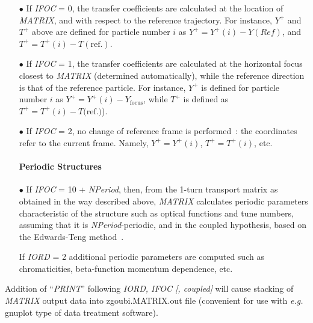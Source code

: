 \begin{itemize}
\item[$\bullet$] If \textsl{IFOC} = 0,  the transfer coefficients are calculated
at the location of \textsl{MATRIX}, and with respect to the reference trajectory. 
For instance, $ Y^+ $ and $ T^+ $ above are defined for particle number $ i $ as 
$Y^+=Y^+(i)-Y(Ref)$,  and $ T^+=T^+(i)-T(\textrm{ref.})$.  

\item[$\bullet$] If \textsl{IFOC} = 1, the transfer coefficients are calculated at the 
horizontal focus  closest to \textsl{MATRIX} (determined 
automatically), while the reference direction is that of the reference  particle. For 
instance, $ Y^+ $ is defined for particle number $ i $ as $ Y^+=Y^+(i) -Y_{\text{focus}} $, 
while  $ T^+ $ is defined as $ T^+=T^+(i)-T(\textrm{ref.)}$).  

\item[$\bullet$] If \textsl{IFOC} = 2, no change of reference frame is 
performed~: the coordinates refer to the current frame. Namely, $ Y^+=Y^+(i)$, 
$ T^+=T^+(i)$,  etc. \

\paragraph{\large Periodic Structures} 

\item[$\bullet$] If \textsl{IFOC} = 10  +  \textsl{NPeriod}, then, 
from the 1-turn transport matrix as obtained in the way described above,
 \textsl{MATRIX} calculates periodic parameters characteristic  of the structure 
such as  optical functions and tune numbers, assuming that it is \textsl{NPeriod}-periodic, 
and  in the coupled hypothesis, based on the Edwards-Teng method~\cite{Coupling}. 

If  \textsl{IORD} = 2 additional 
periodic parameters are computed such as chromaticities,  beta-function momentum dependence, 
 etc. 


\end{itemize}

 

\medskip

\noindent  Addition of ``\textsl{PRINT}'' following \textsl{IORD, IFOC [, coupled]} will cause 
stacking of \textsl{MATRIX} output data into   zgoubi.MATRIX.out  
file (convenient for use with \emph{e.g.} gnuplot type of data treatment software). 


